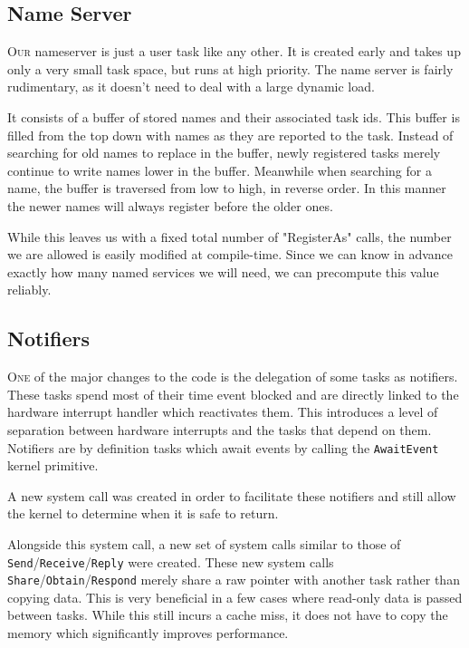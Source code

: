 \documentclass{amsart}
\begin{document}
\subsection*{Name Server}

\textsc{Our} nameserver is just a user task like any other. It is created early and takes
up only a very small task space, but runs at high priority. The name server is
fairly rudimentary, as it doesn't need to deal with a large dynamic load.

It consists of a buffer of stored names and their associated task ids. This
buffer is filled from the top down with names as they are reported to the task.
Instead of searching for old names to replace in the buffer, newly registered
tasks merely continue to write names lower in the buffer. Meanwhile when
searching for a name, the buffer is traversed from low to high, in reverse
order. In this manner the newer names will always register before the older
ones.

While this leaves us with a fixed total number of "RegisterAs" calls, the number
we are allowed is easily modified at compile-time. Since we can know in advance
exactly how many named services we will need, we can precompute this value
reliably.


\subsection*{Notifiers}

\textsc{One} of the major changes to the code is the delegation of some tasks as
notifiers. These tasks spend most of their time event blocked and are directly
linked to the hardware interrupt handler which reactivates them. This introduces
a level of separation between hardware interrupts and the tasks that depend on
them. Notifiers are by definition tasks which await events by calling the
\texttt{AwaitEvent} kernel primitive.

A new system call was created in order to facilitate these notifiers and still
allow the kernel to determine when it is safe to return.

Alongside this system call, a new set of system calls similar to those of
\texttt{Send}/\texttt{Receive}/\texttt{Reply} were created. These new system
calls \texttt{Share}/\texttt{Obtain}/\texttt{Respond} merely share a raw pointer
with another task rather than copying data. This is very beneficial in a few
cases where read-only data is passed between tasks. While this still incurs a
cache miss, it does not have to copy the memory which significantly improves
performance.
\end{document}
